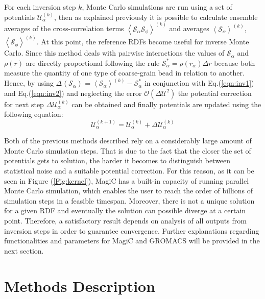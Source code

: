 \documentclass[10pt,a4paper,twoside]{article}
\begin{document}
For each inversion step $k$, Monte Carlo simulations are run using a set of potentials $\mathcal{U}_{\alpha}^{(k)}$, then as explained previously it is possible to calculate ensemble averages of the cross-correlation terms ${\left\langle\mathcal{S}_\alpha\mathcal{S}_\phi\right\rangle}^{(k)}$ and averages $\left\langle\mathcal{S}_\alpha\right\rangle^{(k)}$, $\left\langle\mathcal{S}_\phi\right\rangle^{(k)}$. At this point, the reference RDFs become useful for inverse Monte Carlo. Since this method deals with pairwise interactions the values of $\mathcal{S}_\alpha$ and $\rho(r)$ are directly proportional following the rule $\mathcal{S}_\alpha^{*}= \rho(r_\alpha)\Delta r $ \cite{magic} because both measure the quantity of one type of coarse-grain bead in relation to another. Hence, by using $\Delta\left\langle\mathcal{S}_\alpha\right\rangle = \left\langle\mathcal{S}_\alpha\right\rangle^{(k)} - \mathcal{S}_\alpha^{*}$  in conjunction with Eq.(\ref{eqn:inv1}) and Eq.(\ref{eqn:inv2}) and neglecting the error $\mathcal{O}({\Delta\mathcal{U}}^2)$ the potential correction for next step $\Delta\mathcal{U}_\alpha^{(k)}$ can be obtained and finally potentials are updated using the following  equation:
 \begin{equation}
\mathcal{U}_\alpha^{(k+1)}= \mathcal{U}_\alpha^{(k)}+\Delta\mathcal{U}_\alpha^{(k)}
\label{eqn:potup}
\end{equation} 

Both of the previous methods described rely on a considerably large amount of Monte Carlo simulation steps. That is due to the fact that the closer the set of potentials gets to solution, the harder it becomes to distinguish between statistical noise and a suitable potential correction. For this reason, as it can be seen in Figure (\ref{Fig:kernel}), MagiC has a built-in capacity of running parallel Monte Carlo simulation, which enables the user to reach the order of billions of simulation steps in a feasible timespan. Moreover, there is not a unique solution for a given RDF \cite{ibi} and eventually the solution can possible diverge at a certain point. Therefore, a satisfactory result depends on analysis of all outputs from inversion steps in order to guarantee convergence. Further explanations regarding functionalities and parameters for MagiC and GROMACS will be provided in the next section.   
 
\section{Methods Description} 
\end{document}
